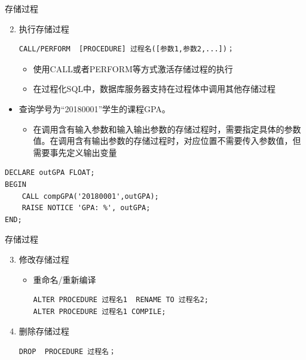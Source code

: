 \begin{frame}{存储过程}
\begin{enumerate}
\setcounter{enumi}{1}
    \item 执行存储过程

\begin{block}{}
\begin{lstlisting}    
CALL/PERFORM  [PROCEDURE] 过程名([参数1,参数2,...])；
\end{lstlisting}
\end{block}
\begin{itemize}
    \item 使用CALL或者PERFORM等方式激活存储过程的执行
    \item 在过程化SQL中，数据库服务器支持在过程体中调用其他存储过程
\end{itemize}
\end{enumerate}

\framebreak
\begin{itemize}
    \item 查询学号为“20180001”学生的课程GPA。
    \begin{itemize}
        \item 在调用含有输入参数和输入输出参数的存储过程时，需要指定具体的参数值。在调用含有输出参数的存储过程时，对应位置不需要传入参数值，但需要事先定义输出变量
    \end{itemize}
\end{itemize}

\begin{block}{}
\begin{lstlisting}
DECLARE outGPA FLOAT;
BEGIN
    CALL compGPA('20180001',outGPA);
    RAISE NOTICE 'GPA: %', outGPA;
END;

\end{lstlisting}
\end{block}

\end{frame}

\begin{frame}{存储过程}
\begin{enumerate}
\setcounter{enumi}{2}
    \item 修改存储过程
    \begin{itemize}
        \item 重命名/重新编译
\begin{block}{}
\begin{lstlisting}
ALTER PROCEDURE 过程名1  RENAME TO 过程名2;
ALTER PROCEDURE 过程名1 COMPILE;
\end{lstlisting}
\end{block}
    \end{itemize}
    \item 删除存储过程 
\begin{block}{}
\begin{lstlisting}
DROP  PROCEDURE 过程名；
\end{lstlisting}
\end{block}

\end{enumerate}
\end{frame}


